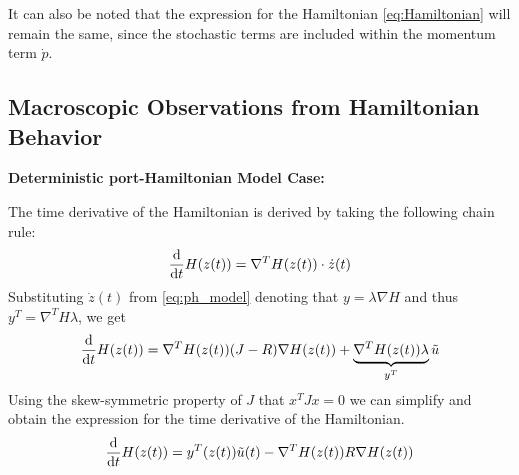 It can also be noted that the expression for the Hamiltonian \autoref{eq:Hamiltonian} will remain the same, since the stochastic terms are included within the momentum term $\dot p$. 

\subsection{Macroscopic Observations from Hamiltonian Behavior}
\label{section:stoch_derivative}
\textbf{Deterministic port-Hamiltonian Model Case:}

The time derivative of the Hamiltonian is derived by taking the following chain rule:
\begin{align*}
    \dfrac{\mathrm d }{\mathrm d t}H(z(t)) = \nabla^T H(z(t))\cdot \dot z(t)
\end{align*}
Substituting $\dot z(t)$ from \autoref{eq:ph_model} denoting that $y = \lambda \nabla H$ and thus $y^T = \nabla^T H \lambda$, we get
\begin{align*}
    \dfrac{\mathrm d }{\mathrm d t}H(z(t)) = \nabla^T H(z(t))(J-R)\nabla H(z(t)) + \underbrace{\nabla^T H(z(t)) \lambda}_{y^T} \tilde u
\end{align*}
Using the skew-symmetric property of $J$ that $x^TJx=0$ we can simplify and obtain the expression for the time derivative of the Hamiltonian.
\begin{align}
    \frac{\mathrm d }{\mathrm d t}H(z(t)) = y^T(z(t))\tilde u(t) - \nabla^T H(z(t))R \nabla H(z(t))
\end{align}

